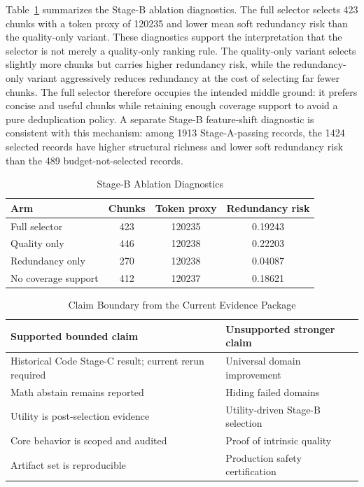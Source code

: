 \documentclass[conference]{IEEEtran}
\begin{document}
Table~\ref{tab:ablation} summarizes the Stage-B ablation diagnostics.  The full
selector selects 423 chunks with a token proxy of 120235 and lower mean soft
redundancy risk than the quality-only variant.  These diagnostics support the
interpretation that the selector is not merely a quality-only ranking rule.
The quality-only variant selects slightly more chunks but carries higher
redundancy risk, while the redundancy-only variant aggressively reduces
redundancy at the cost of selecting far fewer chunks.  The full selector
therefore occupies the intended middle ground: it prefers concise and useful
chunks while retaining enough coverage support to avoid a pure deduplication
policy.  A separate Stage-B feature-shift diagnostic is consistent with this
mechanism: among 1913 Stage-A-passing records, the 1424 selected records have
higher structural richness and lower soft redundancy risk than the 489
budget-not-selected records.

\begin{table}[t]
\caption{Stage-B Ablation Diagnostics}
\label{tab:ablation}
\centering
\footnotesize
\setlength{\tabcolsep}{3pt}
\begin{tabular}{lccc}
\toprule
Arm & Chunks & Token proxy & Redundancy risk \\
\midrule
Full selector & 423 & 120235 & 0.19243 \\
Quality only & 446 & 120238 & 0.22203 \\
Redundancy only & 270 & 120238 & 0.04087 \\
No coverage support & 412 & 120237 & 0.18621 \\
\bottomrule
\end{tabular}
\end{table}

\begin{table}[t]
\caption{Claim Boundary from the Current Evidence Package}
\label{tab:claimboundary}
\centering
\footnotesize
\begin{tabular}{@{}p{}p{}@{}}
\toprule
Supported bounded claim & Unsupported stronger claim \\
\midrule
Historical Code Stage-C result; current rerun required & Universal domain improvement \\
Math abstain remains reported & Hiding failed domains \\
Utility is post-selection evidence & Utility-driven Stage-B selection \\
Core behavior is scoped and audited & Proof of intrinsic quality \\
Artifact set is reproducible & Production safety certification \\
\bottomrule
\end{tabular}
\end{table}
\end{document}
